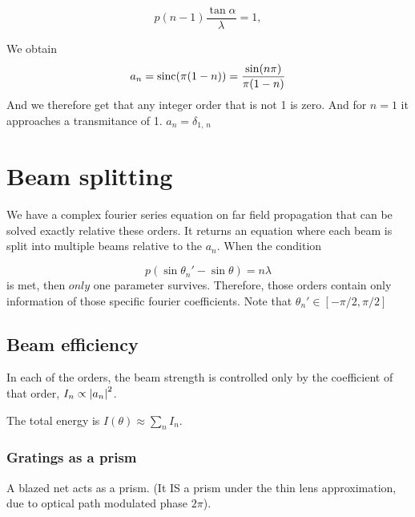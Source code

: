 \documentclass[../main/main.tex]{subfiles}
\begin{document}
\begin{equation}
p(n-1) \frac {\tan \alpha} { \lambda} = 1,
\end{equation}

We obtain
\begin{equation}
a_{n} = \textrm{sinc}(\pi (1-n)) = \frac{\sin(n \pi)}{\pi (1-n)}
\end{equation}
And we therefore get that any integer order that is not 1 is zero. And for $n=1$ it approaches a transmitance of 1. $a_{n} = \delta_{1,\,n}$



\section{Beam splitting}

We have a complex fourier series equation on far field propagation that can be solved exactly relative these orders. It returns an equation where each beam is split into multiple beams relative to the $a_{n}$. When the condition

\begin{equation}
p (\sin \theta_{n}' - \sin \theta) = n \lambda
\end{equation}
is met, then $only$ one parameter survives. Therefore, those orders contain only information of those specific fourier coefficients. Note that $\theta_{n}' \in [-\pi/2, \pi/2]$

\subsection{Beam efficiency}

In each of the orders, the beam strength is controlled only by the coefficient of that order, $I_{n} \propto \abs{a_{n}}^{2}$.

The total energy is $I(\theta) \approx \sum_{n} I_{n}$.

\subsubsection{Gratings as a prism}

A blazed net acts as a prism. (It IS a prism under the thin lens approximation, due to optical path modulated phase $2\pi$).
\end{document}
